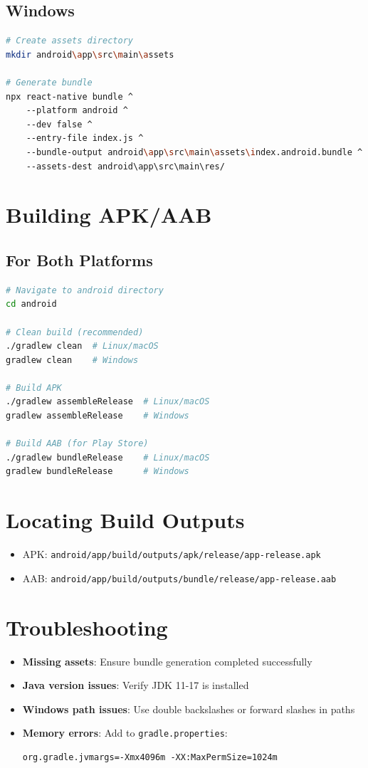 \documentclass{article}
\begin{document}
\subsection{Windows}
\begin{lstlisting}[language=bash, caption=Windows bundle generation]
# Create assets directory
mkdir android\app\src\main\assets

# Generate bundle
npx react-native bundle ^
    --platform android ^
    --dev false ^
    --entry-file index.js ^
    --bundle-output android\app\src\main\assets\index.android.bundle ^
    --assets-dest android\app\src\main\res/
\end{lstlisting}

\section{Building APK/AAB}

\subsection{For Both Platforms}
\begin{lstlisting}[language=bash, caption=Build commands]
# Navigate to android directory
cd android

# Clean build (recommended)
./gradlew clean  # Linux/macOS
gradlew clean    # Windows

# Build APK
./gradlew assembleRelease  # Linux/macOS
gradlew assembleRelease    # Windows

# Build AAB (for Play Store)
./gradlew bundleRelease    # Linux/macOS
gradlew bundleRelease      # Windows
\end{lstlisting}

\section{Locating Build Outputs}
\begin{itemize}
    \item APK: \texttt{android/app/build/outputs/apk/release/app-release.apk}
    \item AAB: \texttt{android/app/build/outputs/bundle/release/app-release.aab}
\end{itemize}

\section{Troubleshooting}
\begin{itemize}
    \item \textbf{Missing assets}: Ensure bundle generation completed successfully
    \item \textbf{Java version issues}: Verify JDK 11-17 is installed
    \item \textbf{Windows path issues}: Use double backslashes or forward slashes in paths
    \item \textbf{Memory errors}: Add to \texttt{gradle.properties}:
    \begin{lstlisting}
org.gradle.jvmargs=-Xmx4096m -XX:MaxPermSize=1024m
    \end{lstlisting}
\end{itemize}
\end{document}
